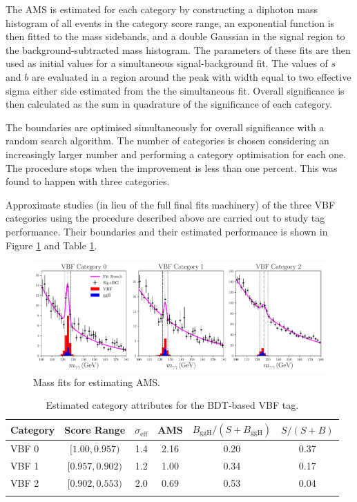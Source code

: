 The $\mathrm{AMS}$ is estimated for each category by constructing a diphoton mass histogram of all events in the category score range, an exponential function is then fitted to the mass sidebands, and a double Gaussian in the signal region to the background-subtracted mass histogram. The parameters of these fits are then used as initial values for a simultaneous signal-background fit. 
The values of $s$ and $b$ are evaluated in a region around the peak with width equal to two effective sigma either side estimated from the the simultaneous fit. Overall significance is then calculated as the sum in quadrature of the significance of each category. 

The boundaries are optimised simultaneously for overall significance with a random search algorithm. The number of categories is chosen considering an increasingly larger number and performing a category optimisation for each one. The procedure stops when the improvement is less than one percent. This was found to happen with three categories. 

Approximate studies (in lieu of the full final fits machinery) of the three VBF categories using the procedure described above are carried out to study tag performance. Their boundaries and their estimated performance is shown in Figure \ref{fig:event_categorisaton:bdt_mass_fits} and Table \ref{tab:event_selection:legacy_cats}.
\begin{figure}[h!]
    \centering
    \includegraphics[width=1.0\textwidth]{figures/event_selection/BDT_mass_fits.pdf}
    \caption{Mass fits for estimating AMS.}
    \label{fig:event_categorisaton:bdt_mass_fits}
\end{figure}
\begin{table}[h!]
    \centering
    \renewcommand{\arraystretch}{1.3}
    \begin{tabular}{ l | c c c c c }
        \thickhline
        Category & Score Range & $\sigma_{\mathrm{eff}}$ & AMS & $B_{\mathrm{ggH}}/(S+B_{\mathrm{ggH}})$ & $S/(S+B)$ \\
        \hline
        VBF 0 & $[1.00, 0.957)$     & 1.4 &  2.16 & 0.20 & 0.37 \\
        VBF 1 & $[0.957, 0.902)$ & 1.2 &  1.00  & 0.34 & 0.17 \\
        VBF 2 & $[0.902, 0.553)$ & 2.0 &  0.69 & 0.53 & 0.04 \\
        \thickhline
    \end{tabular}
    \caption{Estimated category attributes for the BDT-based VBF tag.}
    \label{tab:event_selection:legacy_cats}
\end{table}






